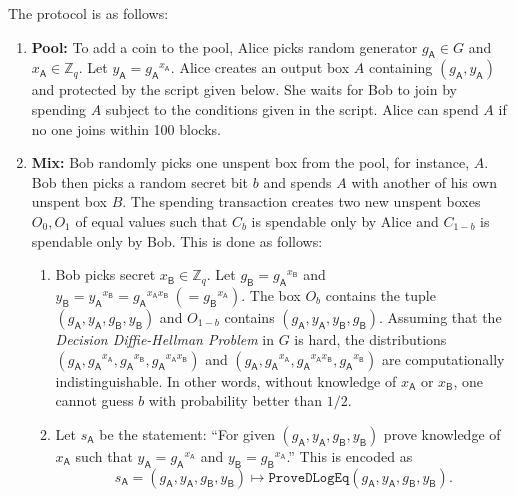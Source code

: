 \documentclass[11pt]{article}
\begin{document}
The protocol is as follows:

\begin{enumerate}
	\item \textbf{Pool:} To add a coin to the pool, Alice picks random generator $g_\textsf{A}\in G$ and $x_\textsf{A}\in \mathbb{Z}_q$. Let $y_\textsf{A} = {g_\textsf{A}}^{x_\textsf{A}}$. Alice creates an output box $A$ containing $(g_\textsf{A}, y_\textsf{A})$ and protected by the script given below. She waits for Bob to join by spending $A$ subject to the conditions given in the script. Alice can spend $A$ if no one joins within 100 blocks. 
	\item \textbf{Mix:} Bob randomly picks one unspent box from the pool, for instance, $A$. Bob then picks a random secret bit $b$ and spends $A$ with another of his own unspent box $B$. The spending transaction creates two new unspent boxes $O_0, O_1$ of equal values such that $C_b$ is spendable only by Alice and $C_{1-b}$ is spendable only by Bob. This is done as follows:
	
	\begin{enumerate}
		
		\item Bob picks secret $x_\textsf{B}\in \mathbb{Z}_q$. Let $g_\textsf{B} = {g_\textsf{A}}^{x_\textsf{B}}$ and $y_\textsf{B} = {y_\textsf{A}}^{x_\textsf{B}} = {g_\textsf{A}}^{x_\textsf{A}x_\textsf{B}}~(={g_\textsf{B}}^{x_\textsf{A}})$.  %
		The box $O_b$ contains the tuple $(g_\textsf{A}, y_\textsf{A}, g_\textsf{B}, y_\textsf{B})$ and $O_{1-b}$ contains $(g_\textsf{A}, y_\textsf{A}, y_\textsf{B}, g_\textsf{B})$. Assuming that the {\em Decision Diffie-Hellman Problem} in $G$ is hard, the distributions $(g_\textsf{A}, {g_\textsf{A}}^{x_\textsf{A}}, {g_\textsf{A}}^{x_\textsf{B}}, {g_\textsf{A}}^{x_\textsf{A}x_\textsf{B}})$ and $(g_\textsf{A}, {g_\textsf{A}}^{x_\textsf{A}}, {g_\textsf{A}}^{x_\textsf{A}x_\textsf{B}}, {g_\textsf{A}}^{x_\textsf{B}})$ are computationally indistinguishable. In other words, without knowledge of $x_\textsf{A}$ or $x_\textsf{B}$, one cannot guess $b$ with probability better than $1/2$.
		\item  Let 
		$s_\textsf{A}$ be the statement: ``For given $(g_\textsf{A}, y_\textsf{A}, g_\textsf{B}, y_\textsf{B})$ 
		prove knowledge of $x_\textsf{A}$ such that $y_\textsf{A} = {g_\textsf{A}}^{x_\textsf{A}}$ and ${y_\textsf{B}} = {g_\textsf{B}}^{x_\textsf{A}}$.'' This is encoded as $$s_\textsf{A} = (g_\textsf{A}, y_\textsf{A}, g_\textsf{B}, y_\textsf{B}) \mapsto \texttt{ProveDLogEq}(g_\textsf{A}, y_\textsf{A}, g_\textsf{B}, y_\textsf{B}).$$
		

\end{enumerate}
\end{enumerate}
\end{document}

